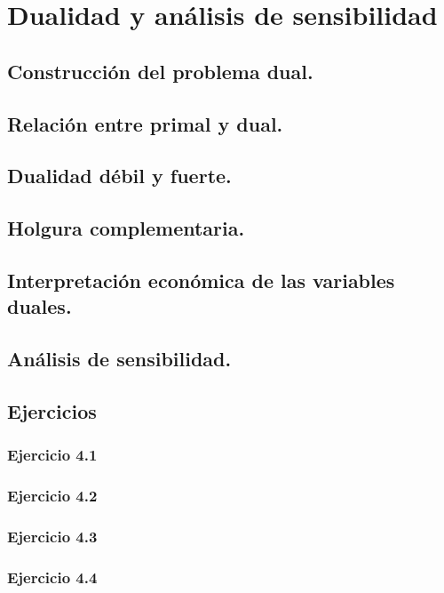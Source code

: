 \section{Dualidad y análisis de sensibilidad}

\subsection{Construcción del problema dual.}
\subsection{Relación entre primal y dual.}
\subsection{Dualidad débil y fuerte.}
\subsection{Holgura complementaria.}
\subsection{Interpretación económica de las variables duales.}
\subsection{Análisis de sensibilidad.}

\subsection{Ejercicios}

\subsubsection{Ejercicio 4.1}


\subsubsection{Ejercicio 4.2}


\subsubsection{Ejercicio 4.3}


\subsubsection{Ejercicio 4.4}


